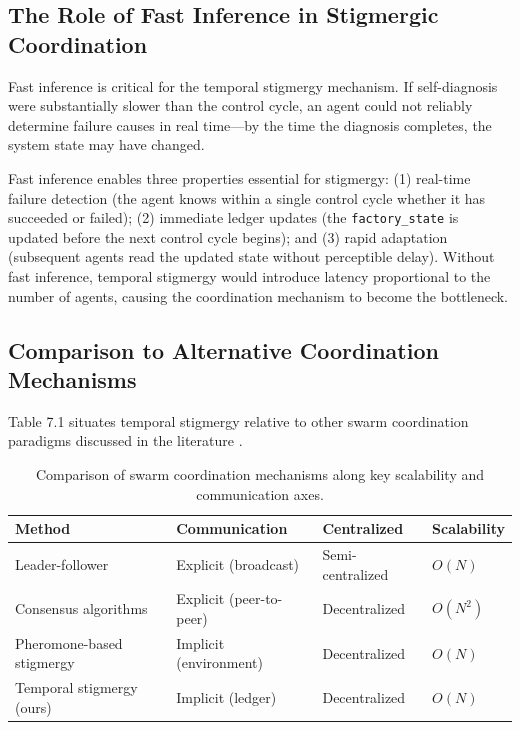 \documentclass[12pt,a4paper,oneside]{report}
\begin{document}
\subsection{The Role of Fast Inference in Stigmergic Coordination}

Fast inference is critical for the temporal stigmergy mechanism. If self-diagnosis were substantially slower than the control cycle, an agent could not reliably determine failure causes in real time—by the time the diagnosis completes, the system state may have changed.

Fast inference enables three properties essential for stigmergy: (1) real-time failure detection (the agent knows within a single control cycle whether it has succeeded or failed); (2) immediate ledger updates (the \texttt{factory\_state} is updated before the next control cycle begins); and (3) rapid adaptation (subsequent agents read the updated state without perceptible delay). Without fast inference, temporal stigmergy would introduce latency proportional to the number of agents, causing the coordination mechanism to become the bottleneck.

\subsection{Comparison to Alternative Coordination Mechanisms}

Table 7.1 situates temporal stigmergy relative to other swarm coordination paradigms discussed in the literature \cite{bongard2006resilient, cully2015robots, domberg2026selfadapting}.

\begin{table}[H]
\centering
\small
\setlength{\tabcolsep}{4pt}
\caption{Comparison of swarm coordination mechanisms along key scalability and communication axes.}
\label{tab:coordination_comparison}
\begin{tabular}{>{\raggedright\arraybackslash}p{4.0cm} >{\raggedright\arraybackslash}p{4.0cm} >{\centering\arraybackslash}p{2.6cm} >{\centering\arraybackslash}p{2.6cm}}
\toprule
\textbf{Method} & \textbf{Communication} & \textbf{Centralized} & \textbf{Scalability} \\
\midrule
Leader-follower & Explicit (broadcast) & Semi-centralized & $O(N)$ \\
Consensus algorithms & Explicit (peer-to-peer) & Decentralized & $O(N^2)$ \\
Pheromone-based stigmergy & Implicit (environment) & Decentralized & $O(N)$ \\
Temporal stigmergy (ours) & Implicit (ledger) & Decentralized & $O(N)$ \\
\bottomrule
\end{tabular}
\end{table}
\end{document}
